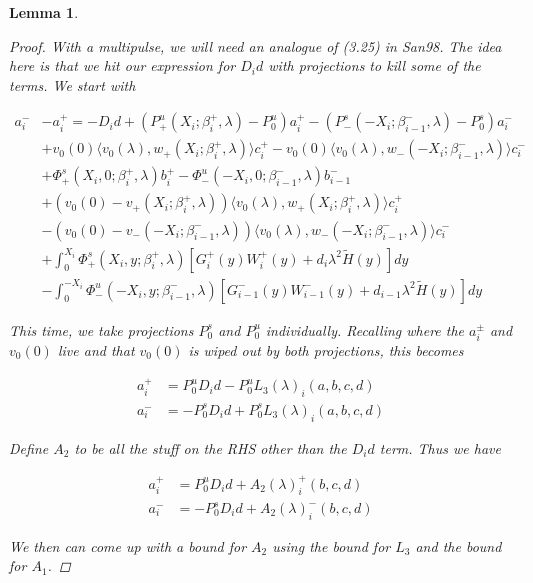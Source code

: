\documentclass[12pt]{article}
\newtheorem{lemma}{Lemma}
\begin{document}
\begin{lemma}
\begin{proof}
With a multipulse, we will need an analogue of (3.25) in San98. The idea here is that we hit our expression for $D_i d$ with projections to kill some of the terms. We start with

\begin{align*}
a_i^- &- a_i^+ = -D_i d + (P^u_+(X_i; \beta_i^+, \lambda) - P_0^u)a_i^+ - (P^s_-(-X_i; \beta_{i-1}^-, \lambda) - P_0^s)a_i^- \\
&+ v_0(0) \langle v_0(\lambda), w_+(X_i; \beta_i^+, \lambda) \rangle c_i^+ 
- v_0(0) \langle v_0(\lambda), w_-(-X_i; \beta_{i-1}^-, \lambda) \rangle c_i^- \\
&+ \Phi^s_+(X_i, 0; \beta_i^+, \lambda)b_i^+ - \Phi^u_-(-X_i, 0; \beta_{i-1}^-, \lambda)b_{i-1}^- \\
&+ (v_0(0) - v_+(X_i; \beta_i^+, \lambda)) \langle v_0(\lambda), w_+(X_i; \beta_i^+, \lambda) \rangle c_i^+ \\
&- (v_0(0) - v_-(-X_i; \beta_{i-1}^-, \lambda)) \langle v_0(\lambda), w_-(-X_i; \beta_{i-1}^-, \lambda) \rangle c_i^- \\
&+ \int_0^{X_i} \Phi^s_+(X_i, y; \beta_i^+, \lambda) [ G_i^+(y) W_i^+(y) + d_i \lambda^2 \tilde{H}(y) ] dy \\
&- \int_0^{-X_i} \Phi^u_-(-X_i, y; \beta_{i-1}^-, \lambda) [ G_{i-1}^-(y) W_{i-1}^-(y) + d_{i-1} \lambda^2 \tilde{H}(y) ] dy 
\end{align*}

This time, we take projections $P^s_0$ and $P^u_0$ individually. Recalling where the $a_i^\pm$ and $v_0(0)$ live and that $v_0(0)$ is wiped out by both projections, this becomes 

\begin{align*}
a_i^+ &= P^u_0 D_i d - P^u_0 L_3(\lambda)_i(a, b, c, d) \\
a_i^- &= -P^s_0 D_i d + P^s_0 L_3(\lambda)_i(a, b, c, d)
\end{align*}

Define $A_2$ to be all the stuff on the RHS other than the $D_i d$ term. Thus we have 

\begin{align*}
a_i^+ &= P^u_0 D_i d + A_2(\lambda)_i^+(b, c, d) \\
a_i^- &= -P^s_0 D_i d + A_2(\lambda)_i^-(b, c, d)
\end{align*}

We then can come up with a bound for $A_2$ using the bound for $L_3$ and the bound for $A_1$.


\end{proof}
\end{lemma}
\end{document}
